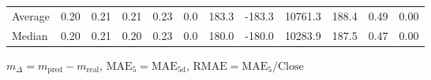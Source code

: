 \begin{threeparttable}
{\begin{tabular}{lrrrrrrrrrrr}
Average &          0.20 &          0.21 &          0.21 &        0.23 &                 0.0 &               183.3 &     -183.3 &             10761.3 &            188.4 &            0.49 &                   0.00 \\
 Median &          0.20 &          0.21 &          0.20 &        0.23 &                 0.0 &               180.0 &     -180.0 &             10283.9 &            187.5 &            0.47 &                   0.00 \\
\bottomrule
\end{tabular}
}
\begin{tablenotes}\footnotesize
\item $m_\Delta=m_{\text{pred}}-m_{\text{real}}$,
$\mathrm{MAE}_5=\mathrm{MAE}_{5\text{d}}$,
$\mathrm{RMAE}=\mathrm{MAE}_5/\text{Close}$
\end{tablenotes}
\end{threeparttable}
\endgroup

